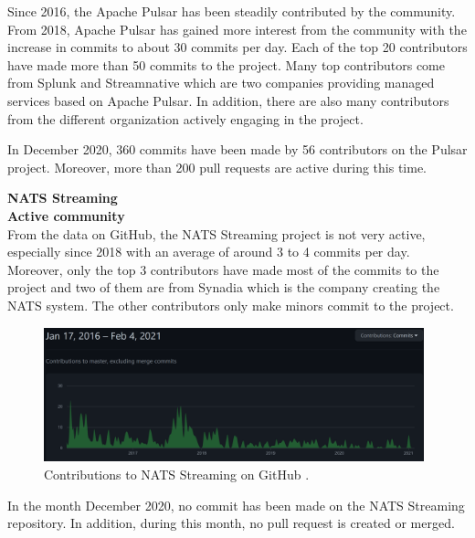 Since 2016, the Apache Pulsar has been steadily contributed by the community. From 2018, Apache Pulsar has gained more interest from the community with the increase in commits to about 30 commits per day. Each of the top 20 contributors have made more than 50 commits to the project. Many top contributors come from Splunk and Streamnative which are two companies providing managed services based on Apache Pulsar. In addition, there are also many contributors from the different organization actively engaging in the project.

In December 2020, 360 commits have been made by 56 contributors on the Pulsar project. Moreover, more than 200 pull requests are active during this time. 

\large \textbf{NATS Streaming}\\
\normalsize
\textbf{Active community}\\
From the data on GitHub, the NATS Streaming project is not very active, especially since 2018 with an average of around 3 to 4 commits per day. Moreover, only the top 3 contributors have made most of the commits to the project and two of them are from Synadia which is the company creating the NATS system. The other contributors only make minors commit to the project. 

\begin{figure}[h]
	\centering
	\includegraphics[width=11cm]{images/community-nats.png}
	\caption{Contributions to NATS Streaming on GitHub \cite{natsrepo}.}
	\label{fig:communitynats}
\end{figure}

In the month December 2020, no commit has been made on the NATS Streaming repository. In addition, during this month, no pull request is created or merged. 

